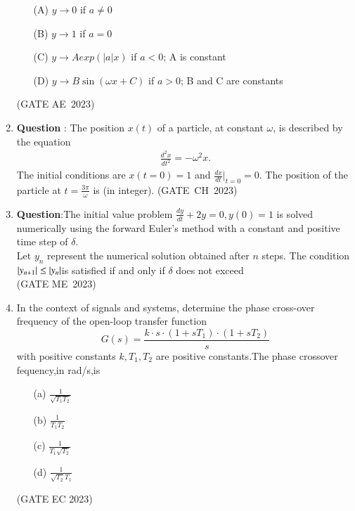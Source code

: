 \begin{enumerate}[label=\thechapter.\arabic*,ref=\thechapter.\theenumi]
\begin{enumerate}
  \item[(A)]  $y \to 0$ if $a \neq 0$ \\ 
  \item[(B)]  $y \to 1$ if $a = 0$\\
  \item[(C)]  $y \to Aexp(|a|x)$ if $a < 0$; A is constant\\
  \item[(D)]  $y \to B \sin(\omega x+C)$ if $a>0$; B and C are constants\\
\end{enumerate}
\hfill(GATE AE 2023)
\solution

\newpage


\item \textbf{Question }:
The position $x(t)$ of a particle, at constant $\omega$, is described by the equation
\begin{align}
\frac{{d^2x}}{{dt^2}} = -\omega^2 x.
\end{align}
The initial conditions are $x(t=0)=1$ and $\frac{{dx}}{{dt}}\bigg|_{t=0}=0$. 
The position of the particle at $t=\frac{{3\pi}}{{\omega}}$ is \underline{\hspace{2cm}} (in integer).
\hfill{(GATE CH 2023)}
\solution
\newpage

\item \textbf{Question}:The initial value problem
$\frac{dy}{dt}+2y=0, y(0)=1 $
is solved numerically using the forward Euler's method with a constant and positive time step of $\delta $.\\
Let $y_n$ represent the numerical solution obtained after $n$ steps. The condition $\left\vert y_{n+1}\right\vert \leq \left\vert y_n\right\vert$is satisfied if and only if $\delta$ does not exceed \\
\hfill{(GATE ME 2023)}\\
\solution 

\newpage

\item In the context of signals and systems, determine the phase cross-over frequency of the open-loop transfer function
\[
G(s) = \frac{k \cdot s \cdot (1+sT_1) \cdot (1+sT_2)}{s}
\]
with positive constants $k, T_1, T_2$ are positive constants.The phase crossover fequency,in rad/s,is
\begin{enumerate}
  \item[(a)] $\frac{1}{\sqrt{T_1 T_2}}$
  \item[(b)] $\frac{1}{T_1 T_2}$
  \item[(c)] $\frac{1}{T_1\sqrt{T_2}}$
  \item[(d)] $\frac{1}{\sqrt{T_2}T_1}$
\end{enumerate}
\hfill{(GATE EC 2023)}
\solution
\newpage


\end{enumerate}
